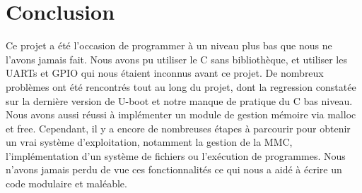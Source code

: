 \documentclass[frenchb]{article}
\begin{document}
\clearpage

\section*{Conclusion}

\noindent Ce projet a été l'occasion de programmer à un niveau plus bas que nous ne l'avons jamais fait. Nous avons pu utiliser le C sans bibliothèque, et utiliser les UARTs et GPIO qui nous étaient inconnus avant ce projet.
De nombreux problèmes ont été rencontrés tout au long du projet, dont la regression constatée sur la dernière version de U-boot et notre manque de pratique du C bas niveau. 
Nous avons aussi réussi à implémenter un module de gestion mémoire via malloc et free.
Cependant, il y a encore de nombreuses étapes à parcourir pour obtenir un vrai système d'exploitation, notamment la gestion de la MMC, l'implémentation d'un système de fichiers ou l'exécution de programmes. Nous n'avons jamais perdu de vue ces fonctionnalités ce qui nous a aidé à écrire un code modulaire et maléable.
\end{document}
